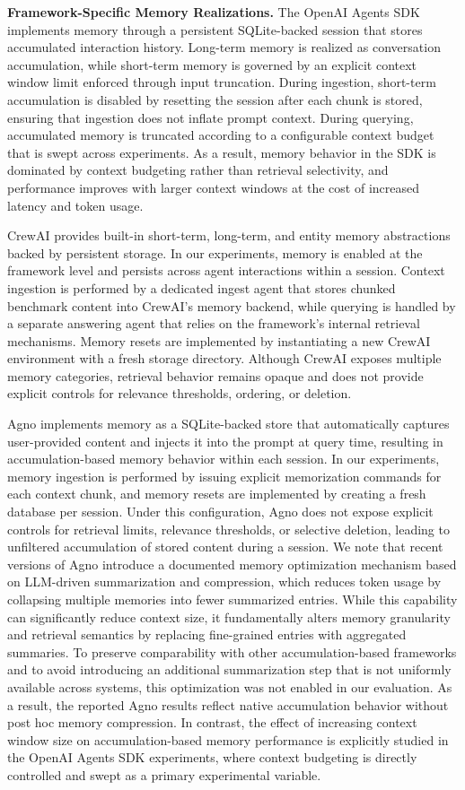 \textbf{Framework-Specific Memory Realizations.}
The OpenAI Agents SDK implements memory through a persistent SQLite-backed session that stores accumulated interaction history. Long-term memory is realized as conversation accumulation, while short-term memory is governed by an explicit context window limit enforced through input truncation. During ingestion, short-term accumulation is disabled by resetting the session after each chunk is stored, ensuring that ingestion does not inflate prompt context. During querying, accumulated memory is truncated according to a configurable context budget that is swept across experiments. As a result, memory behavior in the SDK is dominated by context budgeting rather than retrieval selectivity, and performance improves with larger context windows at the cost of increased latency and token usage.

CrewAI provides built-in short-term, long-term, and entity memory abstractions backed by persistent storage. In our experiments, memory is enabled at the framework level and persists across agent interactions within a session. Context ingestion is performed by a dedicated ingest agent that stores chunked benchmark content into CrewAI’s memory backend, while querying is handled by a separate answering agent that relies on the framework’s internal retrieval mechanisms. Memory resets are implemented by instantiating a new CrewAI environment with a fresh storage directory. Although CrewAI exposes multiple memory categories, retrieval behavior remains opaque and does not provide explicit controls for relevance thresholds, ordering, or deletion.


Agno implements memory as a SQLite-backed store that automatically captures user-provided content and injects it into the prompt at query time, resulting in accumulation-based memory behavior within each session. In our experiments, memory ingestion is performed by issuing explicit memorization commands for each context chunk, and memory resets are implemented by creating a fresh database per session. Under this configuration, Agno does not expose explicit controls for retrieval limits, relevance thresholds, or selective deletion, leading to unfiltered accumulation of stored content during a session. We note that recent versions of Agno introduce a documented memory optimization mechanism based on LLM-driven summarization and compression, which reduces token usage by collapsing multiple memories into fewer summarized entries. While this capability can significantly reduce context size, it fundamentally alters memory granularity and retrieval semantics by replacing fine-grained entries with aggregated summaries. To preserve comparability with other accumulation-based frameworks and to avoid introducing an additional summarization step that is not uniformly available across systems, this optimization was not enabled in our evaluation. As a result, the reported Agno results reflect native accumulation behavior without post hoc memory compression. In contrast, the effect of increasing context window size on accumulation-based memory performance is explicitly studied in the OpenAI Agents SDK experiments, where context budgeting is directly controlled and swept as a primary experimental variable. 


